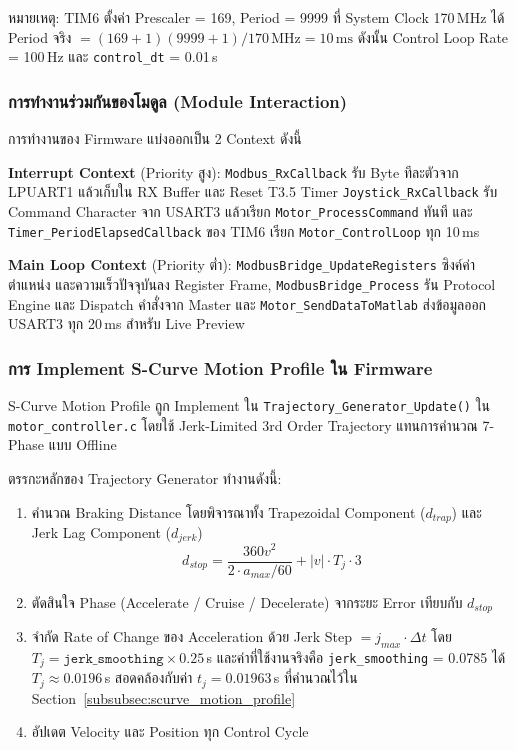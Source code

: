 หมายเหตุ: TIM6 ตั้งค่า Prescaler = 169, Period = 9999
ที่ System Clock 170\,MHz ได้ Period จริง
$= (169+1)(9999+1)/170\,\text{MHz} = 10\,\text{ms}$
ดังนั้น Control Loop Rate = 100\,Hz
และ \texttt{control\_dt} = 0.01\,s

\subsubsection{การทำงานร่วมกันของโมดูล (Module Interaction)}
\label{subsubsec:module_interaction}

การทำงานของ Firmware แบ่งออกเป็น 2 Context ดังนี้

\textbf{Interrupt Context} (Priority สูง):
\texttt{Modbus\_RxCallback} รับ Byte ทีละตัวจาก LPUART1
แล้วเก็บใน RX Buffer และ Reset T3.5 Timer
\texttt{Joystick\_RxCallback} รับ Command Character
จาก USART3 แล้วเรียก \texttt{Motor\_ProcessCommand}
ทันที และ \texttt{Timer\_PeriodElapsedCallback} ของ TIM6
เรียก \texttt{Motor\_ControlLoop} ทุก 10\,ms

\textbf{Main Loop Context} (Priority ต่ำ):
\texttt{ModbusBridge\_UpdateRegisters} ซิงค์ค่าตำแหน่ง
และความเร็วปัจจุบันลง Register Frame,
\texttt{ModbusBridge\_Process} รัน Protocol Engine
และ Dispatch คำสั่งจาก Master และ
\texttt{Motor\_SendDataToMatlab} ส่งข้อมูลออก USART3
ทุก 20\,ms สำหรับ Live Preview

\subsubsection{การ Implement S-Curve Motion Profile ใน Firmware}
\label{subsubsec:scurve_implementation}

S-Curve Motion Profile ถูก Implement ใน
\texttt{Trajectory\_Generator\_Update()} ใน
\texttt{motor\_controller.c} โดยใช้
Jerk-Limited 3rd Order Trajectory
แทนการคำนวณ 7-Phase แบบ Offline

ตรรกะหลักของ Trajectory Generator ทำงานดังนี้:
\begin{enumerate}
  \item คำนวณ Braking Distance โดยพิจารณาทั้ง
        Trapezoidal Component ($d_{trap}$)
        และ Jerk Lag Component ($d_{jerk}$)
        \begin{equation}
          d_{stop} = \frac{360 v^2}{2 \cdot a_{max}/60}
                   + |v| \cdot T_j \cdot 3
        \end{equation}
  \item ตัดสินใจ Phase (Accelerate / Cruise / Decelerate)
        จากระยะ Error เทียบกับ $d_{stop}$
  \item จำกัด Rate of Change ของ Acceleration ด้วย
        Jerk Step $= j_{max} \cdot \Delta t$
        โดย $T_j = \texttt{jerk\_smoothing} \times 0.25$\,s
        และค่าที่ใช้งานจริงคือ \texttt{jerk\_smoothing} = 0.0785
        ได้ $T_j \approx 0.0196$\,s
        สอดคล้องกับค่า $t_j = 0.01963$\,s
        ที่คำนวณไว้ใน Section~\ref{subsubsec:scurve_motion_profile}
  \item อัปเดต Velocity และ Position ทุก Control Cycle
\end{enumerate}

